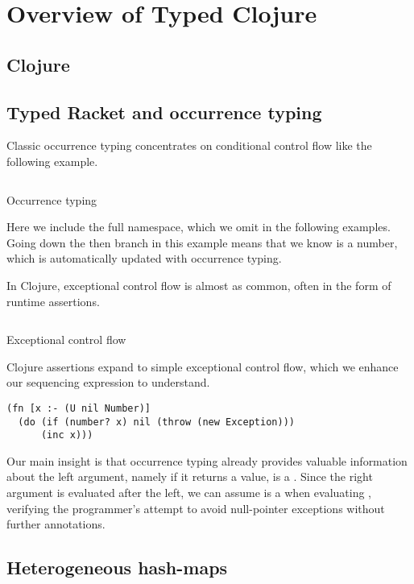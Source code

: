 \section{Overview of Typed Clojure}

\subsection{Clojure}

\subsection{Typed Racket and occurrence typing}

Classic occurrence typing concentrates on conditional
control flow like the following example.

\begin{listing}
\inputminted[firstline=1]{clojure}{code/demo/src/demo/eg1.clj}
\caption{Occurrence typing}
\end{listing}

Here we include the full namespace, which we omit in the following
examples. Going down the then branch in this example means that we know
 is a number, which is automatically updated with occurrence typing.

In Clojure, exceptional control flow is almost as common, often in the form of
runtime assertions. 


\begin{listing}
\inputminted[firstline=5,lastline=7]{clojure}{code/demo/src/demo/do.clj}
\caption{Exceptional control flow}
\end{listing}

Clojure assertions expand to simple exceptional control flow,
which we enhance our sequencing \doliteral{} expression to understand.

\begin{verbatim}
(fn [x :- (U nil Number)]
  (do (if (number? x) nil (throw (new Exception)))
      (inc x)))
\end{verbatim}

Our main insight is that occurrence typing already provides
valuable information about the left argument,
namely if it returns a value,  is a .
Since the right argument is evaluated after the left, we can assume
 is a  when evaluating , verifying
the programmer's attempt to avoid null-pointer exceptions without further annotations.

\subsection{Heterogeneous hash-maps}

